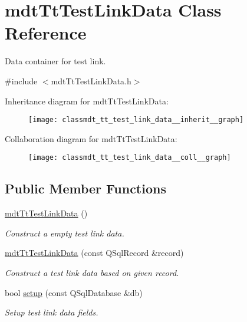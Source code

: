 \hypertarget{classmdt_tt_test_link_data}{\section{mdt\-Tt\-Test\-Link\-Data Class Reference}
\label{classmdt_tt_test_link_data}
}


Data container for test link.  




{\ttfamily \#include $<$mdt\-Tt\-Test\-Link\-Data.\-h$>$}



Inheritance diagram for mdt\-Tt\-Test\-Link\-Data\-:\nopagebreak
\begin{figure}[H]
\begin{center}
\leavevmode
\texttt{[image: classmdt\_tt\_test\_link\_data\_\_inherit\_\_graph]}
\end{center}
\end{figure}


Collaboration diagram for mdt\-Tt\-Test\-Link\-Data\-:\nopagebreak
\begin{figure}[H]
\begin{center}
\leavevmode
\texttt{[image: classmdt\_tt\_test\_link\_data\_\_coll\_\_graph]}
\end{center}
\end{figure}
\subsection*{Public Member Functions}
\begin{DoxyCompactItemize}
\item 
\hyperlink{classmdt_tt_test_link_data_a09b7664a67dbb69b81b24639f0ae1708}{mdt\-Tt\-Test\-Link\-Data} ()
\begin{DoxyCompactList}\small\item\em Construct a empty test link data. \end{DoxyCompactList}\item 
\hyperlink{classmdt_tt_test_link_data_a6cff6f9f8fd2cde0160d4b440ce803aa}{mdt\-Tt\-Test\-Link\-Data} (const Q\-Sql\-Record \&record)
\begin{DoxyCompactList}\small\item\em Construct a test link data based on given record. \end{DoxyCompactList}\item 
bool \hyperlink{classmdt_tt_test_link_data_a4f05562048965ed1318dc9814004db4d}{setup} (const Q\-Sql\-Database \&db)
\begin{DoxyCompactList}\small\item\em Setup test link data fields. \end{DoxyCompactList}\end{DoxyCompactItemize}
